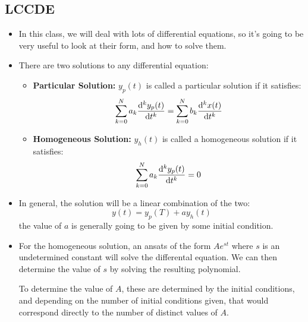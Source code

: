 \subsection{LCCDE} 
\begin{itemize}
	\item In this class, we will deal with lots of differential equations, so it's going to be very useful to 
		look at their form, and how to solve them.   
	\item There are two solutions to any differential equation: 
		\begin{itemize}
			\item \textbf{Particular Solution:} \( y_p(t) \) is called a particular solution if it satisfies:
				\[
					\sum_{k = 0}^{N}a_k \dv[k]{y_p(t)}{t} = \sum_{k = 0}^{N}b_k \dv[k]{x(t)}{t}
				\] 
			\item \textbf{Homogeneous Solution:} \( y_h(t) \) is called a homogeneous solution if it satisfies:  
				\[
						\sum_{k = 0}^{N}a_k \dv[k]{y_p(t)}{t} =	0
				\] 
		\end{itemize}
	\item In general, the solution will be a linear combination of the two: 
		\[
		y(t) = y_p(T) + ay_h(t)
		\] 
		the value of \( a \) is generally going to be given by some initial condition. 
	\item For the homogeneous solution, an ansats of the form \( Ae^{st} \) where \( s \) is an undetermined constant 
		will solve the differental equation. We can then determine the value of \( s \) by solving the resulting 
		polynomial.

		To determine the value of \( A \), these are determined by the initial conditions, and depending on the 
		number of initial conditions given, that would correspond directly to the number of distinct values of \( A \). 
\end{itemize}

